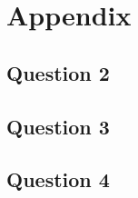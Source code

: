 
\section{Appendix}


\subsection{Question 2}





\subsection{Question 3}




\subsection{Question 4}





